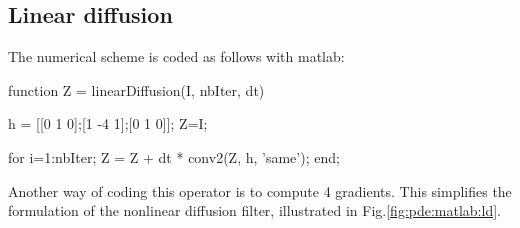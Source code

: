 \def\QRCODE{TB_IPR_TUT.IMG.pde_matlabqrcode.png}
\def\QRPAGE{http://www.iptutorials.science/tree/master/TB_IPR/TUT.IMG.pde/matlab}


\subsection{Linear diffusion}

The numerical scheme is coded as follows with matlab:
\begin{matlab}
function Z = linearDiffusion(I, nbIter, dt)

h = [[0 1 0];[1 -4 1];[0 1 0]];
Z=I; %

for i=1:nbIter;
    Z = Z + dt * conv2(Z, h, 'same');
end;
\end{matlab}

Another way of coding this operator is to compute 4 gradients. This simplifies the formulation of the nonlinear diffusion filter, illustrated in Fig.\ref{fig:pde:matlab:ld}.

